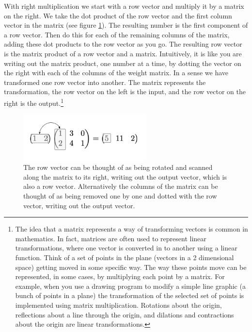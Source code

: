 With right multiplication we start with a row vector and multiply it by a matrix on the right. We take the dot product of the row vector and the first column vector in the matrix (see figure \ref{vectorMatrixProduct}). The resulting number is the first component of a row vector. Then do this for each of the remaining columns of the matrix, adding these dot products to the row vector as you go. The resulting row vector is the matrix product of a row vector and a matrix. Intuitively, it is like you are writing out the matrix product, one number at a time, by dotting the vector on the right with each of the columns of the weight matrix. In a sense we have transformed one row vector into another. The matrix represents the transformation, the row vector on the left is the input, and the row vector on the right is the output.\footnote{The idea that a matrix represents a way of transforming vectors is common in mathematics. In fact, matrices are often used to represent linear transformations, where one vector is converted in to another using a linear function. Think of a set of points in the plane (vectors in a 2 dimensional space) getting moved in some specific way. The way these points move can be represented, in some cases, by multiplying each point by a matrix. For example, when you use a drawing program to modify a simple line graphic (a bunch of points in a plane) the transformation of the selected set of points is implemented using matrix multiplication. Rotations about the origin, reflections about a line through the origin, and dilations and contractions about the origin are linear transformations.}

\begin{figure}[h]
\centering
\includegraphics[width=0.6\textwidth]{images/vectorMatrixProduct.png}
\caption[Jeff Yoshimi.]{The row vector can be thought of as being rotated and scanned along the matrix to its right, writing out the output vector, which is also a row vector. Alternatively the columns of the matrix can be thought of as being removed one by one and dotted with the row vector, writing out the output vector.}
\label{vectorMatrixProduct}
\end{figure}

